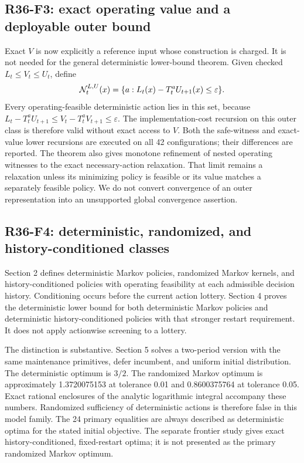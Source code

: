 \subsection{R36-F3: exact operating value and a deployable outer bound}
Exact $V$ is now explicitly a reference input whose construction is charged. It is not needed for the general deterministic lower-bound theorem. Given checked $L_t\leq V_t\leq U_t$, define
\[
 \mathcal N_t^{L,U}(x)=\{a:L_t(x)-T_t^aU_{t+1}(x)\leq\varepsilon\}.
\]
Every operating-feasible deterministic action lies in this set, because
$L_t-T_t^aU_{t+1}\leq V_t-T_t^aV_{t+1}\leq\varepsilon$.
The implementation-cost recursion on this outer class is therefore valid without exact access to $V$. Both the safe-witness and exact-value lower recursions are executed on all 42 configurations; their differences are reported. The theorem also gives monotone refinement of nested operating witnesses to the exact necessary-action relaxation. That limit remains a relaxation unless its minimizing policy is feasible or its value matches a separately feasible policy. We do not convert convergence of an outer representation into an unsupported global convergence assertion.

\subsection{R36-F4: deterministic, randomized, and history-conditioned classes}
Section 2 defines deterministic Markov policies, randomized Markov kernels, and history-conditioned policies with operating feasibility at each admissible decision history. Conditioning occurs before the current action lottery. Section 4 proves the deterministic lower bound for both deterministic Markov policies and deterministic history-conditioned policies with that stronger restart requirement. It does not apply actionwise screening to a lottery.

The distinction is substantive. Section 5 solves a two-period version with the same maintenance primitives, defer incumbent, and uniform initial distribution. The deterministic optimum is $3/2$. The randomized Markov optimum is approximately 1.3720075153 at tolerance 0.01 and 0.8600375764 at tolerance 0.05. Exact rational enclosures of the analytic logarithmic integral accompany these numbers. Randomized sufficiency of deterministic actions is therefore false in this model family. The 24 primary equalities are always described as deterministic optima for the stated initial objective. The separate frontier study gives exact history-conditioned, fixed-restart optima; it is not presented as the primary randomized Markov optimum.

